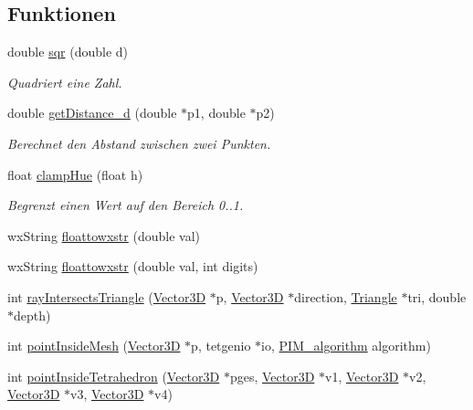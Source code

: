 \subsection*{Funktionen}
\begin{DoxyCompactItemize}
\item 
\hypertarget{namespaceUtils_afac34330dde6235ee7395a4fd412ae0d}{double \hyperlink{namespaceUtils_afac34330dde6235ee7395a4fd412ae0d}{sqr} (double d)}\label{namespaceUtils_afac34330dde6235ee7395a4fd412ae0d}

\begin{DoxyCompactList}\small\item\em Quadriert eine Zahl. \end{DoxyCompactList}\item 
double \hyperlink{namespaceUtils_ac924242f1790eaecb91b4965d3a661aa}{get\-Distance\-\_\-d} (double $\ast$p1, double $\ast$p2)
\begin{DoxyCompactList}\small\item\em Berechnet den Abstand zwischen zwei Punkten. \end{DoxyCompactList}\item 
float \hyperlink{namespaceUtils_abb647325616858e0fad55290c36ea03b}{clamp\-Hue} (float h)
\begin{DoxyCompactList}\small\item\em Begrenzt einen Wert auf den Bereich 0..1. \end{DoxyCompactList}\item 
wx\-String \hyperlink{namespaceUtils_a233ff9a0b34b10195a434f1ff66323b8}{floattowxstr} (double val)
\item 
wx\-String \hyperlink{namespaceUtils_ac47160b3665d77f9e1a49a4045053add}{floattowxstr} (double val, int digits)
\item 
int \hyperlink{namespaceUtils_a5f216cc7011a901130db81321b565334}{ray\-Intersects\-Triangle} (\hyperlink{classVector3D}{Vector3\-D} $\ast$p, \hyperlink{classVector3D}{Vector3\-D} $\ast$direction, \hyperlink{classTriangle}{Triangle} $\ast$tri, double $\ast$depth)
\item 
int \hyperlink{namespaceUtils_af8fc5d6dab27f759ab5d76757a53023f}{point\-Inside\-Mesh} (\hyperlink{classVector3D}{Vector3\-D} $\ast$p, tetgenio $\ast$io, \hyperlink{namespaceUtils_ad369b0127cabda0d6871ce1ae7e6c862}{P\-I\-M\-\_\-algorithm} algorithm)
\item 
int \hyperlink{namespaceUtils_a9b995a1220a78be108b19bda4b776332}{point\-Inside\-Tetrahedron} (\hyperlink{classVector3D}{Vector3\-D} $\ast$pges, \hyperlink{classVector3D}{Vector3\-D} $\ast$v1, \hyperlink{classVector3D}{Vector3\-D} $\ast$v2, \hyperlink{classVector3D}{Vector3\-D} $\ast$v3, \hyperlink{classVector3D}{Vector3\-D} $\ast$v4)

\end{DoxyCompactItemize}
